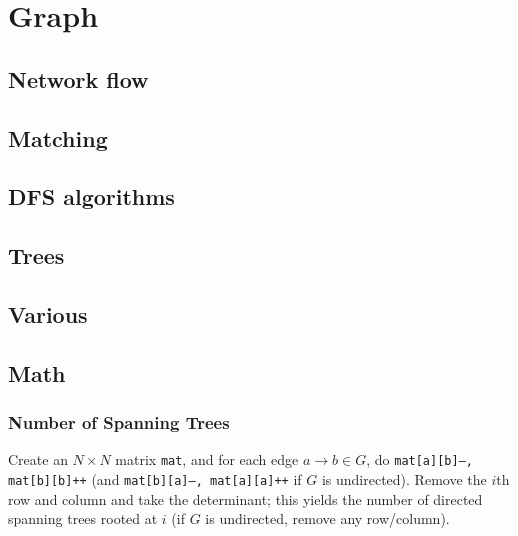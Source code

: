 \chapter{Graph}

\section{Network flow}

\section{Matching}

\section{DFS algorithms}

\section{Trees}
	
\section{Various}

\section{Math}
	\subsection{Number of Spanning Trees}
		Create an $N\times N$ matrix \texttt{mat}, and for each edge $a \rightarrow b \in G$, do
		\texttt{mat[a][b]--, mat[b][b]++} (and \texttt{mat[b][a]--, mat[a][a]++} if $G$ is undirected).
		Remove the $i$th row and column and take the determinant; this yields the number of directed spanning trees rooted at $i$
		(if $G$ is undirected, remove any row/column).

